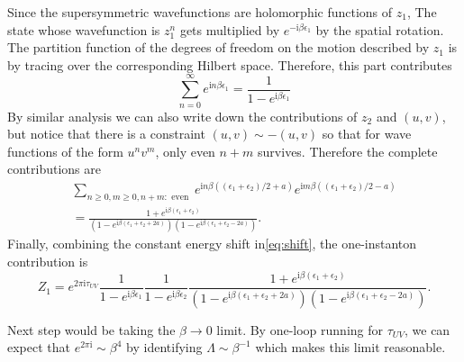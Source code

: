 \documentclass{article}
\begin{document}
Since the supersymmetric wavefunctions are holomorphic functions of $z_1$, The state whose wavefunction is $z_1^n$ gets multiplied by $e^{-\mathrm{i} \beta \epsilon_1}$ by the spatial rotation. The partition function of the degrees of freedom on the motion described by $z_1$ is by tracing over the corresponding Hilbert space. Therefore, this part contributes
\begin{equation}
\sum_{n=0}^{\infty} e^{\mathrm{i} n \beta \epsilon_{1}}=\frac{1}{1-e^{\mathrm{i} \beta \epsilon_{1}}}
\end{equation}
By similar analysis we can also write down the contributions of $z_2$ and $(u,v)$, but notice that there is a constraint $(u,v)\sim-(u,v)$ so that for wave functions of the form $u^n v^m$, only even $n+m$ survives. Therefore the complete contributions are 
\begin{equation}
\begin{aligned}
\sum_{n \geq 0, m \geq 0, n+m: \text { even }} e^{\mathrm{i} n \beta\left(\left(\epsilon_{1}+\epsilon_{2}\right) / 2+a\right)} e^{\mathrm{i} m \beta\left(\left(\epsilon_{1}+\epsilon_{2}\right) / 2-a\right)} \\
= \frac{1+e^{\mathrm{i} \beta\left(\epsilon_{1}+\epsilon_{2}\right)}}{\left(1-e^{\mathrm{i} \beta\left(\epsilon_{1}+\epsilon_{2}+2 a\right)}\right)\left(1-e^{\mathrm{i} \beta\left(\epsilon_{1}+\epsilon_{2}-2 a\right)}\right)} .
\end{aligned}
\end{equation}
Finally, combining the constant energy shift in\eqref{eq:shift}, the one-instanton contribution is
\begin{equation}
Z_{1}=e^{2 \pi \mathrm{i} \tau_{U V}} \frac{1}{1-e^{\mathrm{i} \beta \epsilon_{1}}} \frac{1}{1-e^{\mathrm{i} \beta \epsilon_{2}}} \frac{1+e^{\mathrm{i} \beta\left(\epsilon_{1}+\epsilon_{2}\right)}}{\left(1-e^{\mathrm{i} \beta\left(\epsilon_{1}+\epsilon_{2}+2 a\right)}\right)\left(1-e^{\mathrm{i} \beta\left(\epsilon_{1}+\epsilon_{2}-2 a\right)}\right)} .
\end{equation}

Next step would be taking the $\beta\to 0$ limit. By one-loop running for $\tau_{UV}$, we can expect that $e^{2 \pi \mathrm{i}}\sim \beta^4$ by identifying $\Lambda \sim \beta^{-1}$ which makes this limit reasonable. 
\end{document}
